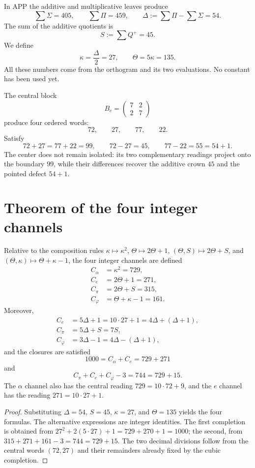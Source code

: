 In APP the additive and multiplicative leaves produce
\[
 \sum\Sigma=405,
 \qquad
 \sum\Pi=459,
 \qquad
 \Delta:=\sum\Pi-\sum\Sigma=54.
\]
The sum of the additive quotients is
\[
 S:=\sum Q^+=45.
\]
We define
\[
 \kappa=\frac{\Delta}{2}=27,
 \qquad
 \Theta=5\kappa=135.
\]
All these numbers come from the orthogram and its two evaluations. No constant has been used yet.

The central block
\[
 B_c=\begin{pmatrix}7&2\\2&7\end{pmatrix}
\]
produce four ordered words:
\[
 72,\qquad27,\qquad77,\qquad22.
\]
Satisfy
\[
 72+27=77+22=99,
 \qquad
 72-27=45,
 \qquad
 77-22=55=54+1.
\]
The center does not remain isolated: its two complementary readings
project onto the boundary \(99\), while their differences recover the
additive crown \(45\) and the pointed defect \(54+1\).

\section{Theorem of the four integer channels}

\begin{theorem}
\label{thm:derivacion-canales-enteros}
Relative to the composition rules
\(\kappa\mapsto\kappa^2\), \(\Theta\mapsto2\Theta+1\),
\((\Theta,S)\mapsto2\Theta+S\), and
\((\Theta,\kappa)\mapsto\Theta+\kappa-1\), the four integer
channels are defined
\[
\begin{aligned}
 C_\alpha&=\kappa^2=729,\\
 C_e&=2\Theta+1=271,\\
 C_\pi&=2\Theta+S=315,\\
 C_\varphi&=\Theta+\kappa-1=161.
\end{aligned}
\]
Moreover,
\[
\begin{aligned}
 C_e&=5\Delta+1=10\cdot27+1
      =4\Delta+(\Delta+1),\\
 C_\pi&=5\Delta+S=7S,\\
 C_\varphi&=3\Delta-1
      =4\Delta-(\Delta+1),
\end{aligned}
\]
and the closures are satisfied
\[
 \boxed{1000=C_\alpha+C_e=729+271}
\]
and
\[
 \boxed{C_\pi+C_e+C_\varphi-3=744=729+15.}
\]
The \(\alpha\) channel also has the central reading
\(729=10\cdot72+9\), and the \(e\) channel has the reading
\(271=10\cdot27+1\).
\end{theorem}

\begin{proof}
Substituting \(\Delta=54\), \(S=45\), \(\kappa=27\), and
\(\Theta=135\) yields the four formulas. The alternative expressions are
integer identities. The first completion is obtained from
\(27^2+2(5\cdot27)+1=729+270+1=1000\); the second, from
\(315+271+161-3=744=729+15\). The two decimal divisions follow from
the central words \((72,27)\) and their remainders already fixed by the
cubic completion.
\end{proof}

